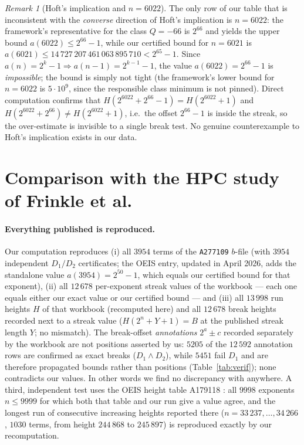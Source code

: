 \documentclass[11pt]{article}
\theoremstyle{remark}
\newtheorem{remark}[theorem]{Remark}
\begin{document}
\begin{remark}[Hoft's implication and $n=6022$]\label{rmk:hoft}
The only row of our table that is inconsistent with the \emph{converse} direction of Hoft's
implication is $n=6022$: the framework's representative for the class $Q=-66$ is $2^{66}$ and yields the
upper bound $a(6022)\le2^{66}-1$, while our certified bound for $n=6021$ is
$a(6021)\le14\,727\,207\,461\,063\,895\,710<2^{65}-1$. Since $a(n)=2^k-1\Rightarrow a(n-1)=2^{k-1}-1$,
the value $a(6022)=2^{66}-1$ is \emph{impossible}; the bound is simply not tight (the framework's lower
bound for $n=6022$ is $5\cdot10^9$, since the responsible class minimum is not pinned). Direct
computation confirms that $H(2^{6022}+2^{66}-1)=H(2^{6022}+1)$ and
$H(2^{6022}+2^{66})\ne H(2^{6022}+1)$, i.e.\ the offset $2^{66}-1$ is inside the streak, so the
over-estimate is invisible to a single break test. No genuine counterexample to Hoft's implication
exists in our data.
\end{remark}

\section{Comparison with the HPC study of Frinkle et al.}\label{sec:comparison}

\paragraph{Everything published is reproduced.} Our computation reproduces
(i) all $3954$ terms of the \texttt{A277109} $b$-file (with $3954$ independent $D_1/D_2$ certificates;
the OEIS entry, updated in April 2026, adds the standalone value $a(3954)=2^{50}-1$, which equals our
certified bound for that exponent),
(ii) all $12\,678$ per-exponent streak values of the workbook \cite{frinkle2025} --- each one equals
either our exact value or our certified bound --- and
(iii) all $13\,998$ run heights $H$ of that workbook (recomputed here) and all $12\,678$ break heights
recorded next to a streak value ($H(2^n+Y+1)=B$ at the published streak length $Y$; no mismatch). The
break-offset \emph{annotations} $2^a\pm c$ recorded separately by the workbook are not positions
asserted by us: $5205$ of the $12\,592$ annotation rows are confirmed as exact breaks
($D_1\wedge D_2$), while $5451$ fail $D_1$ and are therefore propagated bounds rather than positions
(Table~\ref{tab:verif}); none contradicts our values.
In other words we find no discrepancy with \cite{frinkle2025} anywhere. A third, independent test uses
the OEIS height table A179118 \cite{oeisA179118}: all $9998$ exponents $n\le9999$ for which both that
table and our run give a value agree, and the longest run of consecutive increasing heights reported
there ($n=33\,237,\dots,34\,266$, $1030$ terms, from height $244\,868$ to $245\,897$) is reproduced
exactly by our recomputation.
\end{document}
